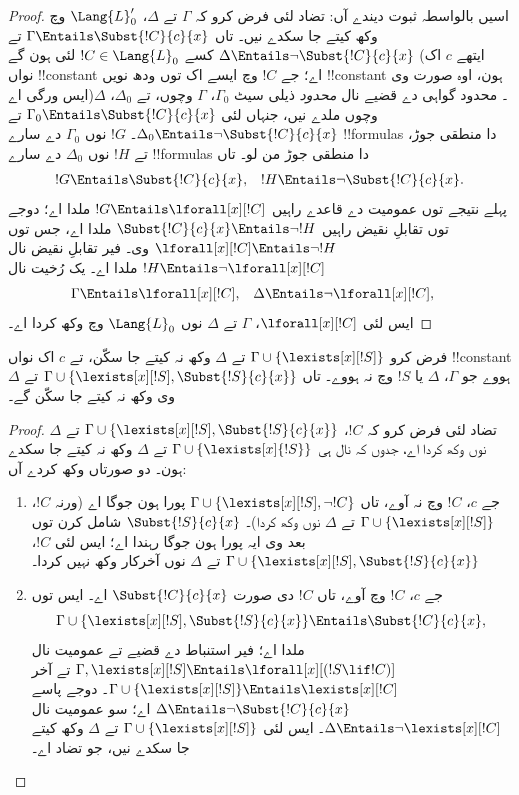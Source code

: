 \documentclass[../../../include/open-logic-section]{subfiles}
\begin{document}
\begin{proof}
اسیں بالواسطہ ثبوت دیندے آں: تضاد لئی فرض کرو
کہ $\Gamma$ تے $\Delta$،
$\Lang{L}'_0$ وچ وکھ کیتے جا سکدے نیں۔
تاں $\Gamma \Entails
\Subst{!C}{c}{x}$ تے
$\Delta \Entails \lnot \Subst{!C}{c}{x}$
کسے $!C \in \Lang{L}_0$ لئی ہون گے
(ایتھے $c$ اک نواں !!{constant}
اے؛ جے $!C$ وچ ایسے اک توں ودھ نویں
!!{constant} ہون، اوہ صورت وی ایس ورگی اے)۔
محدود گواہی دے قضیے نال \emph{محدود}
ذیلی سیٹ $\Gamma_0$، $\Gamma$ وچوں،
تے $\Delta_0$، $\Delta$ وچوں ملدے نیں،
جنہاں لئی $\Gamma_0 \Entails \Subst{!C}{c}{x}$
تے $\Delta_0 \Entails \lnot \Subst{!C}{c}{x}$۔
$!G$ نوں $\Gamma_0$ دے سارے !!{formula}s
دا منطقی جوڑ، تے $!H$ نوں $\Delta_0$ دے
سارے !!{formula}s دا منطقی جوڑ من لو۔ تاں
\begin{align*}
  !G & \Entails \Subst{!C}{c}{x}, & !H  \Entails \lnot \Subst{!C}{c}{x}.
\end{align*}
پہلے نتیجے توں عمومیت دے قاعدے راہیں
$!G \Entails
\lforall[x][!C]$ ملدا اے؛ دوجے
توں تقابلِ نقیض راہیں
$\Subst{!C}{c}{x} \Entails \lnot !H$
ملدا اے، جس توں
$\lforall[x][!C]
\Entails \lnot !H$ وی۔ فیر
تقابلِ نقیض نال $!H \Entails
\lnot \lforall[x][!C]$ ملدا اے۔
یک رُخیت نال
\begin{align*}
  \Gamma &\Entails \lforall[x][!C], & 
  \Delta & \Entails \lnot \lforall[x][!C],
\end{align*}
ایس لئی $\lforall[x][!C]$،
$\Gamma$ تے $\Delta$ نوں
$\Lang{L}_0$ وچ وکھ کردا اے۔
\end{proof}

\begin{lem}
فرض کرو $\Gamma \cup \{ \lexists[x][!S] \}$
تے $\Delta$ وکھ نہ کیتے جا سکّن، تے
$c$ اک نواں !!{constant} ہووے جو
$\Gamma$، $\Delta$ یا $!S$ وچ نہ ہووے۔
تاں $\Gamma \cup \{ \lexists[x][!S], \Subst{!S}{c}{x} \}$
تے $\Delta$ وی وکھ نہ کیتے جا سکّن گے۔
\end{lem}

\begin{proof}
تضاد لئی فرض کرو کہ $!C$،
$\Gamma \cup \{
\lexists[x][!S], \Subst{!S}{c}{x}\}$
تے $\Delta$ نوں وکھ کردا اے، جدوں کہ
نال ہی $\Gamma \cup \{\lexists[x]{!S} \}$
تے $\Delta$ وکھ نہ کیتے جا سکدے ہون۔
دو صورتاں وکھ کردے آں:
\begin{enumerate}
\item جے $c$، $!C$ وچ نہ آوے، تاں
  $\Gamma \cup
  \{\lexists[x][!S], \lnot!C \}$
  پورا ہون جوگا اے (ورنہ $!C$،
  $\Gamma \cup \{\lexists[x][!S] \}$
  تے $\Delta$ نوں وکھ کردا)۔
  $\Subst{!S}{c}{x}$ شامل کرن توں بعد وی
  ایہ پورا ہون جوگا رہندا اے؛ ایس لئی
  $!C$، $\Gamma \cup \{ \lexists[x][!S], \Subst{!S}{c}{x} \}$
  تے $\Delta$ نوں آخرکار وکھ نہیں کردا۔
\item جے $c$، $!C$ وچ آوے، تاں
  $!C$ دی صورت
  $\Subst{!C}{c}{x}$ اے۔ ایس توں
  \[
  \Gamma \cup \{ \lexists[x][!S], \Subst{!S}{c}{x}\} \Entails \Subst{!C}{c}{x},
  \]
  ملدا اے؛ فیر استنباط دے قضیے
  تے عمومیت نال
  $\Gamma, \lexists[x][!S] \Entails \lforall[x][(!S \lif !C)]$
  تے آخر $\Gamma
  \cup \{ \lexists[x][!S] \} \Entails \lexists[x][!C]$۔
  دوجے پاسے $\Delta \Entails \lnot \Subst{!C}{c}{x}$
  اے؛ سو عمومیت نال
  $\Delta \Entails \lnot \lexists[x][!C]$۔
  ایس لئی $\Gamma
  \cup \{\lexists[x][!S] \}$
  تے $\Delta$ وکھ کیتے جا سکدے نیں،
  جو تضاد اے۔
\end{enumerate}
\end{proof}
\end{document}
